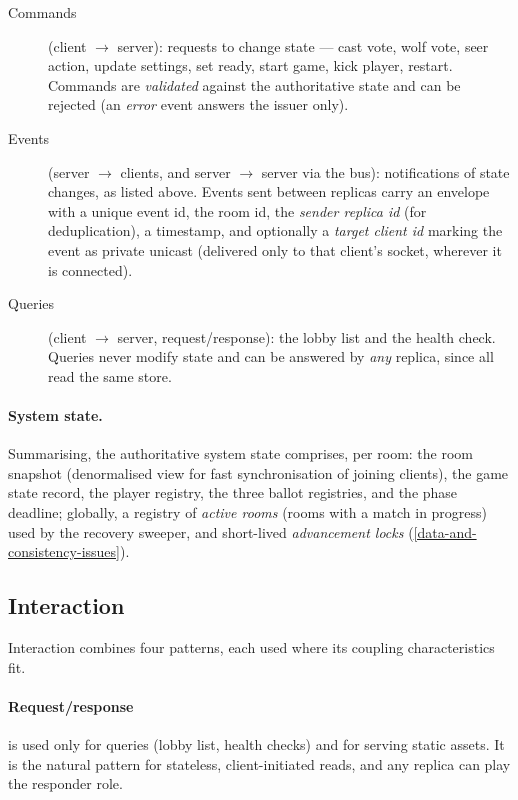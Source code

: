 \documentclass{scrartcl}
\begin{document}
\begin{description}
  \item[Commands] (client $\rightarrow$ server): requests to change state ---
  cast vote, wolf vote, seer action, update settings, set ready, start
  game, kick player, restart. Commands are \emph{validated} against the
  authoritative state and can be rejected (an \emph{error} event answers
  the issuer only).
  \item[Events] (server $\rightarrow$ clients, and server $\rightarrow$
  server via the bus): notifications of state changes, as listed above.
  Events sent between replicas carry an envelope with a unique event id,
  the room id, the \emph{sender replica id} (for deduplication), a
  timestamp, and optionally a \emph{target client id} marking the event
  as private unicast (delivered only to that client's socket, wherever it
  is connected).
  \item[Queries] (client $\rightarrow$ server, request/response): the
  lobby list and the health check. Queries never modify state and can be
  answered by \emph{any} replica, since all read the same store.
\end{description}

\paragraph{System state.}
Summarising, the authoritative system state comprises, per room: the room
snapshot (denormalised view for fast synchronisation of joining clients),
the game state record, the player registry, the three ballot registries,
and the phase deadline; globally, a registry of \emph{active rooms} (rooms
with a match in progress) used by the recovery sweeper, and short-lived
\emph{advancement locks} (\cref{data-and-consistency-issues}).

\subsection{Interaction}\label{interaction}

Interaction combines four patterns, each used where its coupling
characteristics fit.

\paragraph{Request/response} is used only for queries (lobby list, health
checks) and for serving static assets. It is the natural pattern for
stateless, client-initiated reads, and any replica can play the responder
role.
\end{document}
